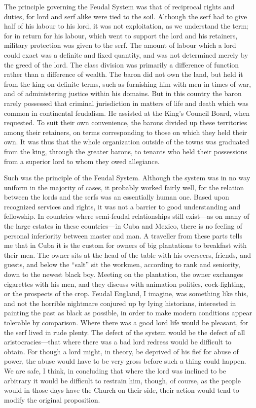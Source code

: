 \documentclass{book}
\begin{document}
The principle governing the Feudal System was that of reciprocal rights and duties, for lord and serf alike were tied to the soil. Although the serf had to give half of his labour to his lord, it was not exploitation, as we understand the term; for in return for his labour, which went to support the lord and his retainers, military protection was given to the serf. The amount of labour which a lord could exact was a definite and fixed quantity, and was not determined merely by the greed of the lord. The class division was primarily a difference of function rather than a difference of wealth. The baron did not own the land, but held it from the king on definite terms, such as furnishing him with men in times of war, and of administering justice within his domains. But in this country the baron rarely possessed that criminal jurisdiction in matters of life and death which was common in continental feudalism. He assisted at the King’s Council Board, when requested. To suit their own convenience, the barons divided up these territories among their retainers, on terms corresponding to those on which they held their own. It was thus that the whole organization outside of the towns was graduated from the king, through the greater barons, to tenants who held their possessions from a superior lord to whom they owed allegiance.

Such was the principle of the Feudal System. Although the system was in no way uniform in the majority of cases, it probably worked fairly well, for the relation between the lords and the serfs was an essentially human one. Based upon recognized services and rights, it was not a barrier to good understanding and fellowship. In countries where semi-feudal relationships still exist—as on many of the large estates in these countries—in Cuba and Mexico, there is no feeling of personal inferiority between master and man. A traveller from these parts tells me that in Cuba it is the custom for owners of big plantations to breakfast with their men. The owner sits at the head of the table with his overseers, friends, and guests, and below the “salt” sit the workmen, according to rank and seniority, down to the newest black boy. Meeting on the plantation, the owner exchanges cigarettes with his men, and they discuss with animation politics, cock-fighting, or the prospects of the crop. Feudal England, I imagine, was something like this, and not the horrible nightmare conjured up by lying historians, interested in painting the past as black as possible, in order to make modern conditions appear tolerable by comparison. Where there was a good lord life would be pleasant, for the serf lived in rude plenty. The defect of the system would be the defect of all aristocracies—that where there was a bad lord redress would be difficult to obtain. For though a lord might, in theory, be deprived of his fief for abuse of power, the abuse would have to be very gross before such a thing could happen. We are safe, I think, in concluding that where the lord was inclined to be arbitrary it would be difficult to restrain him, though, of course, as the people would in those days have the Church on their side, their action would tend to modify the original proposition.
\end{document}
